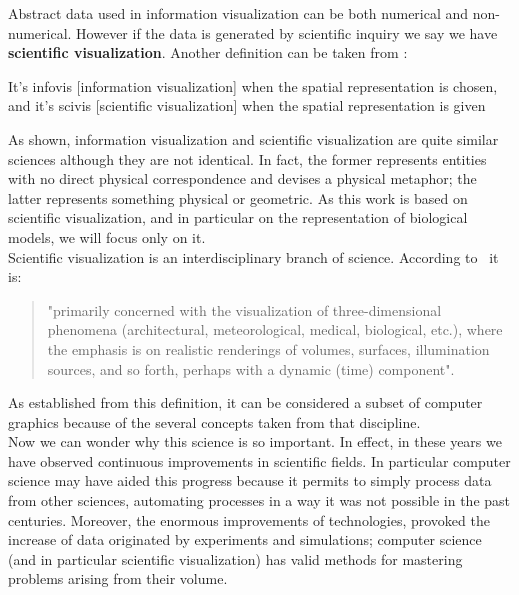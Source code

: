 Abstract data used in information visualization can be both numerical and non-numerical. However if the data is generated by scientific inquiry we say we have \textbf{scientific visualization}. Another definition can be taken from \cite{Munzner}:
\begin{definition}
It's infovis [information visualization] when the spatial representation is chosen, and it's scivis [scientific visualization] when the spatial representation is given                                                                                                                                                                                                                                                                                                                             \end{definition}

As shown, information visualization and scientific visualization are quite similar sciences although they are not identical. In fact, the former represents entities with no direct physical correspondence and devises a physical metaphor; the latter represents something physical or geometric. As this work is based on scientific visualization, and in particular on the representation of biological models, we will focus only on it.\\

Scientific visualization is an interdisciplinary branch of science. According to~\cite{Friendly} it is:
\begin{quotation}
"primarily concerned with the visualization of three-dimensional phenomena (architectural, meteorological, medical, biological, etc.), where the emphasis is on realistic renderings of volumes, surfaces, illumination sources, and so forth, perhaps with a dynamic (time) component".
\end{quotation}
As established from this definition, it can be considered a subset of computer graphics because of the several concepts taken from that discipline.\\

Now we can wonder why this science is so important. In effect, in these years we have observed continuous improvements in scientific fields. In particular computer science may have aided this progress because it permits to simply process data from other sciences, automating processes in a way it was not possible in the past centuries. Moreover, the enormous improvements of technologies, provoked the increase of data originated by experiments and simulations; computer science (and in particular scientific visualization) has valid methods for mastering problems arising from their volume.\\

